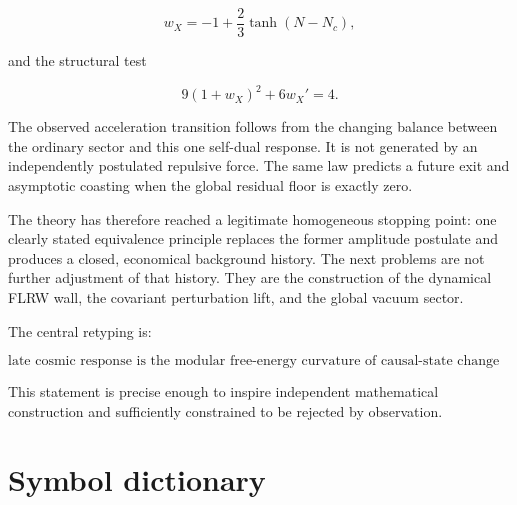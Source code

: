 \documentclass[
  11pt,
  letterpaper,
]{article}
\begin{document}
\[
\boxed{
w_X=-1+\frac23\tanh(N-N_c),
}
\]

and the structural test

\[
\boxed{
9(1+w_X)^2+6w_X'=4.
}
\]

The observed acceleration transition follows from the changing balance
between the ordinary sector and this one self-dual response. It is not
generated by an independently postulated repulsive force. The same law
predicts a future exit and asymptotic coasting when the global residual
floor is exactly zero.

The theory has therefore reached a legitimate homogeneous stopping
point: one clearly stated equivalence principle replaces the former
amplitude postulate and produces a closed, economical background
history. The next problems are not further adjustment of that history.
They are the construction of the dynamical FLRW wall, the covariant
perturbation lift, and the global vacuum sector.

The central retyping is:

\[
\boxed{
\text{late cosmic response is the modular free-energy curvature of causal-state change under scale.}
}
\]

This statement is precise enough to inspire independent mathematical
construction and sufficiently constrained to be rejected by observation.

\appendix

\section{Symbol dictionary}\label{symbol-dictionary}
\end{document}
